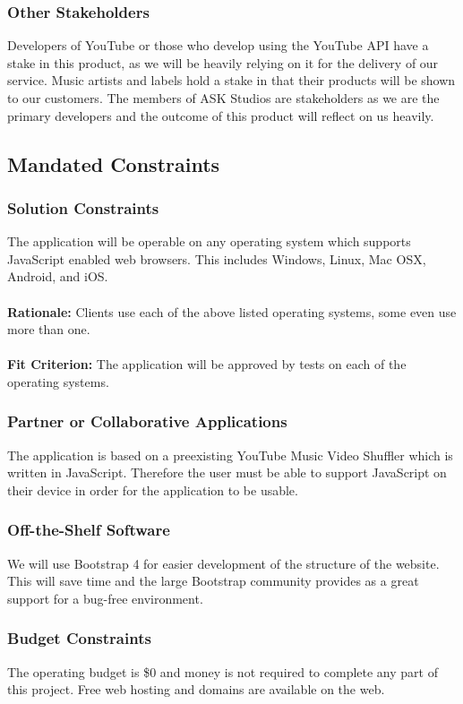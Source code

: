 \documentclass[12pt, titlepage]{article}
\begin{document}
\subsubsection{Other Stakeholders}
Developers of YouTube or those who develop using the YouTube API have a stake in this product, as we will be heavily relying on it for the delivery of our service.  Music artists and labels hold a stake in that their products will be shown to our customers.  The members of ASK Studios are stakeholders as we are the primary developers and the outcome of this product will reflect on us heavily.

\subsection{Mandated Constraints}
\subsubsection{Solution Constraints}
The application will be operable on any operating system which supports JavaScript enabled web browsers. This includes Windows, Linux, Mac OSX, Android, and iOS. \\
\\
\textbf{Rationale:} Clients use each of the above listed operating systems, some even use more than one. \\\\
\textbf{Fit Criterion:} The application will be approved by tests on each of the operating systems.
\subsubsection{Partner or Collaborative Applications}
The application is based on a preexisting YouTube Music Video Shuffler which is written in JavaScript. Therefore the user must be able to support JavaScript on their device in order for the application to be usable.
\subsubsection{Off-the-Shelf Software}
We will use Bootstrap 4 for easier development of the structure of the website. This will save time and the large Bootstrap community provides as a great support for a bug-free environment.
\subsubsection{Budget Constraints}
The operating budget is \$0 and money is not required to complete any part of this project. Free web hosting and domains are available on the web.
\end{document}
